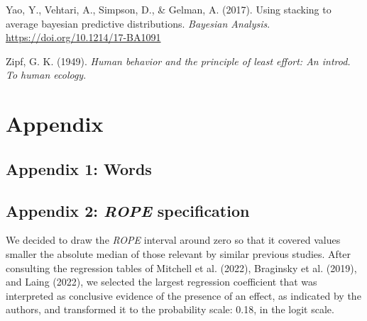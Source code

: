 \documentclass[
  letterpaper,
  DIV=11,
  numbers=noendperiod]{scrartcl}
\newlength{\cslhangindent}
\newlength{\cslentryspacingunit} %
\newenvironment{CSLReferences}[2] %
 {%
  \setlength{\parindent}{0pt}
  \ifodd #1
  \let\oldpar\par
  \def\par{\hangindent=\cslhangindent\oldpar}
  \fi
  \setlength{\parskip}{#2\cslentryspacingunit}
 }%
 {}
\begin{document}
\begin{CSLReferences}{1}{0}
\leavevmode{}%
Yao, Y., Vehtari, A., Simpson, D., \& Gelman, A. (2017). Using stacking
to average bayesian predictive distributions. \emph{Bayesian Analysis}.
\url{https://doi.org/10.1214/17-BA1091}

\leavevmode{}%
Zipf, G. K. (1949). \emph{Human behavior and the principle of least
effort: An introd. To human ecology}.

\end{CSLReferences}

\hypertarget{appendix}{%
\section{Appendix}\label{appendix}}

\hypertarget{appendix-words}{%
\subsection{Appendix 1: Words}\label{appendix-words}}

\hypertarget{appendix-words}{%
\subsection{\texorpdfstring{Appendix 2: \emph{ROPE}
specification}{Appendix 2: ROPE specification}}\label{appendix-words}}

We decided to draw the \emph{ROPE} interval around zero so that it
covered values smaller the absolute median of those relevant by similar
previous studies. After consulting the regression tables of Mitchell et
al. (2022), Braginsky et al. (2019), and Laing (2022), we selected the
largest regression coefficient that was interpreted as conclusive
evidence of the presence of an effect, as indicated by the authors, and
transformed it to the probability scale: 0.18, in the logit scale.
\end{document}

